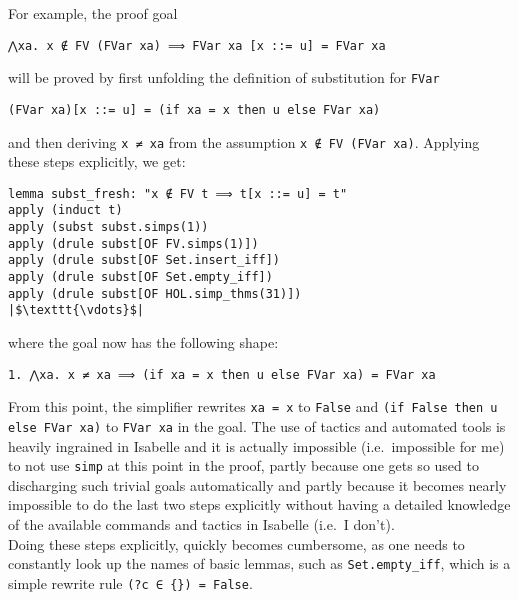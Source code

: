 \documentclass[a4paper, 12pt, twoside]{style/ociamthesis}
\theoremstyle{plain}
\theoremstyle{definition}
\newtheorem{Example}{Example}[chapter]
\theoremstyle{remark}
\renewenvironment{Example}{\begin{OldExample}\begin{mdframed}[style=example, linecolor=yellow]}{\end{mdframed}\end{OldExample}}
\begin{document}
\begin{Example}

For example, the proof goal

\begin{verbatim}
⋀xa. x ∉ FV (FVar xa) ⟹ FVar xa [x ::= u] = FVar xa
\end{verbatim}

will be proved by first unfolding the definition of substitution for
\texttt{FVar}

\begin{verbatim}
(FVar xa)[x ::= u] = (if xa = x then u else FVar xa)
\end{verbatim}

and then deriving \texttt{x ≠ xa} from the assumption
\texttt{x ∉ FV (FVar xa)}. Applying these steps explicitly, we get:

\begin{verbatim}
lemma subst_fresh: "x ∉ FV t ⟹ t[x ::= u] = t"
apply (induct t)
apply (subst subst.simps(1))
apply (drule subst[OF FV.simps(1)])
apply (drule subst[OF Set.insert_iff])
apply (drule subst[OF Set.empty_iff])
apply (drule subst[OF HOL.simp_thms(31)])
|$\texttt{\vdots}$|
\end{verbatim}

where the goal now has the following shape:

\begin{verbatim}
1. ⋀xa. x ≠ xa ⟹ (if xa = x then u else FVar xa) = FVar xa
\end{verbatim}

From this point, the simplifier rewrites \texttt{xa = x} to
\texttt{False} and \texttt{(if False then u else FVar xa)} to
\texttt{FVar xa} in the goal. The use of tactics and automated tools is
heavily ingrained in Isabelle and it is actually impossible
(i.e.~impossible for me) to not use \texttt{simp} at this point in the
proof, partly because one gets so used to discharging such trivial goals
automatically and partly because it becomes nearly impossible to do the
last two steps explicitly without having a detailed knowledge of the
available commands and tactics in Isabelle (i.e.~I don't).\\
Doing these steps explicitly, quickly becomes cumbersome, as one needs
to constantly look up the names of basic lemmas, such as
\texttt{Set.empty\_iff}, which is a simple rewrite rule
\texttt{(?c ∈ \{\}) = False}.

\end{Example}
\end{document}

